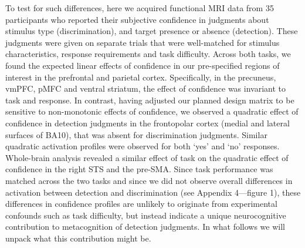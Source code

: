 \documentclass[12pt,twoside]{reedthesis}
\begin{document}
To test for such differences, here we acquired functional MRI data from 35 participants who reported their subjective confidence in judgments about stimulus type (discrimination), and target presence or absence (detection). These judgments were given on separate trials that were well-matched for stimulus characteristics, response requirements and task difficulty. Across both tasks, we found the expected linear effects of confidence in our pre-specified regions of interest in the prefrontal and parietal cortex. Specifically, in the precuneus, vmPFC, pMFC and ventral striatum, the effect of confidence was invariant to task and response. In contrast, having adjusted our planned design matrix to be sensitive to non-monotonic effects of confidence, we observed a quadratic effect of confidence in detection judgments in the frontopolar cortex (medial and lateral surfaces of BA10), that was absent for discrimination judgments. Similar quadratic activation profiles were observed for both `yes' and `no' responses. Whole-brain analysis revealed a similar effect of task on the quadratic effect of confidence in the right STS and the pre-SMA. Since task performance was matched across the two tasks and since we did not observe overall differences in activation between detection and discrimination (see Appendix 4---figure 1), these differences in confidence profiles are unlikely to originate from experimental confounds such as task difficulty, but instead indicate a unique neurocognitive contribution to metacognition of detection judgments. In what follows we will unpack what this contribution might be.
\end{document}
